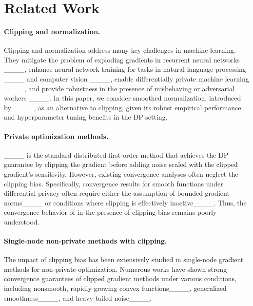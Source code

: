 \section{Related Work}
\label{sec:related_work}

\paragraph{Clipping and normalization.} 
Clipping and normalization
address many key challenges in machine learning. 
They mitigate the problem of exploding gradients in recurrent neural networks ____, enhance neural network training for tasks in natural language processing ____ and computer vision ____, enable differentially private machine learning ____, and provide robustness in the presence of misbehaving or adversarial workers ____. 
In this paper, we consider smoothed normalization, introduced by ____, as an alternative to clipping, given its robust empirical performance and hyperparameter tuning benefits in the DP setting.

\paragraph{Private optimization methods.} 
____ is the standard distributed first-order method that achieves the DP guarantee by clipping  the gradient
before adding noise scaled with the clipped gradient's sensitivity. 
However, existing  convergence analyses often neglect the clipping bias. 
Specifically, convergence results for smooth functions under differential privacy often require either the assumption of bounded gradient norms____ or conditions where clipping is effectively inactive____. 
Thus, the convergence behavior of  in the presence of clipping bias remains poorly understood.


\paragraph{Single-node non-private methods with clipping. } 
The impact of clipping bias has been extensively studied in single-node gradient methods for non-private optimization. 
Numerous works have shown strong convergence guarantees of clipped gradient methods under various conditions, including nonsmooth, rapidly growing convex functions____, generalized smoothness____, and heavy-tailed noise____.


